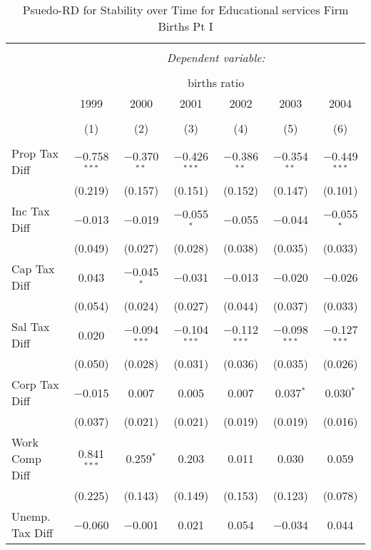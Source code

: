 
\begin{table}[!htbp] \centering 
  \caption{Psuedo-RD for Stability over Time for  Educational services Firm Births Pt I} 
  \label{61year} 
\small 
\begin{tabular}{@{\extracolsep{5pt}}lcccccc} 
\\[-1.8ex]\hline 
\hline \\[-1.8ex] 
 & \multicolumn{6}{c}{\textit{Dependent variable:}} \\ 
\cline{2-7} 
\\[-1.8ex] & \multicolumn{6}{c}{births ratio} \\ 
 & 1999 & 2000 & 2001 & 2002 & 2003 & 2004 \\ 
\\[-1.8ex] & (1) & (2) & (3) & (4) & (5) & (6)\\ 
\hline \\[-1.8ex] 
 Prop Tax Diff & $-$0.758$^{***}$ & $-$0.370$^{**}$ & $-$0.426$^{***}$ & $-$0.386$^{**}$ & $-$0.354$^{**}$ & $-$0.449$^{***}$ \\ 
  & (0.219) & (0.157) & (0.151) & (0.152) & (0.147) & (0.101) \\ 
  Inc Tax Diff & $-$0.013 & $-$0.019 & $-$0.055$^{*}$ & $-$0.055 & $-$0.044 & $-$0.055$^{*}$ \\ 
  & (0.049) & (0.027) & (0.028) & (0.038) & (0.035) & (0.033) \\ 
  Cap Tax Diff & 0.043 & $-$0.045$^{*}$ & $-$0.031 & $-$0.013 & $-$0.020 & $-$0.026 \\ 
  & (0.054) & (0.024) & (0.027) & (0.044) & (0.037) & (0.033) \\ 
  Sal Tax Diff & 0.020 & $-$0.094$^{***}$ & $-$0.104$^{***}$ & $-$0.112$^{***}$ & $-$0.098$^{***}$ & $-$0.127$^{***}$ \\ 
  & (0.050) & (0.028) & (0.031) & (0.036) & (0.035) & (0.026) \\ 
  Corp Tax Diff & $-$0.015 & 0.007 & 0.005 & 0.007 & 0.037$^{*}$ & 0.030$^{*}$ \\ 
  & (0.037) & (0.021) & (0.021) & (0.019) & (0.019) & (0.016) \\ 
  Work Comp Diff & 0.841$^{***}$ & 0.259$^{*}$ & 0.203 & 0.011 & 0.030 & 0.059 \\ 
  & (0.225) & (0.143) & (0.149) & (0.153) & (0.123) & (0.078) \\ 
  Unemp. Tax Diff & $-$0.060 & $-$0.001 & 0.021 & 0.054 & $-$0.034 & 0.044 \\ 

\end{tabular}
\end{table}
